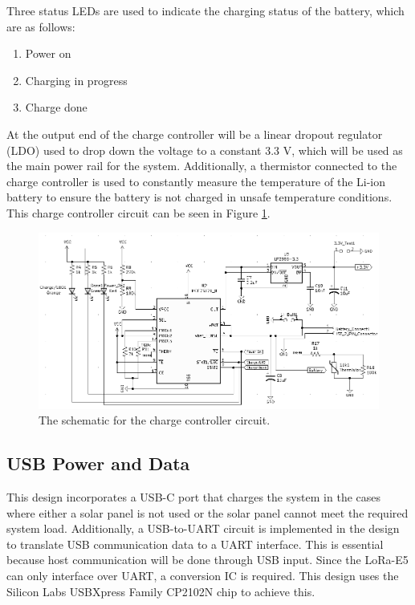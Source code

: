 \documentclass[conference]{IEEEtran}
\begin{document}
Three status LEDs are used to indicate the charging status of the battery, which are as follows:

\begin{enumerate}
\item Power on
\item Charging in progress
\item Charge done
\end{enumerate}

At the output end of the charge controller will be a linear dropout regulator (LDO) used to drop down the voltage to a constant 3.3 V, which will be used as the main power rail for the system. Additionally, a thermistor connected to the charge controller is used to constantly measure the temperature of the Li-ion battery to ensure the battery is not charged in unsafe temperature conditions. This charge controller circuit can be seen in Figure \ref{fig:charge_controller}.

\begin{figure}
    \centering
    \includegraphics[scale=0.65,angle=270,origin=c]{img/Charge Controller.PNG}
    \caption{The schematic for the charge controller circuit.}
    \label{fig:charge_controller}
\end{figure}

\subsection{USB Power and Data}
This design incorporates a USB-C port that charges the system in the cases where either a solar panel is not used or the solar panel cannot meet the required system load. Additionally, a USB-to-UART circuit is implemented in the design to translate USB communication data to a UART interface. This is essential because host communication will be done through USB input. Since the LoRa-E5 can only interface over UART, a conversion IC is required. This design uses the Silicon Labs USBXpress Family CP2102N chip to achieve this. 
\end{document}
